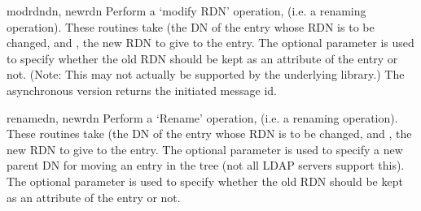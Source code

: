 
\begin{methoddesc}[LDAP]{modrdn}{dn, newrdn }
Perform a `modify RDN' operation, (i.e. a renaming operation).
These routines take  (the DN
of the entry whose RDN is to be changed, and , the new RDN to
give to the entry. The optional parameter  is used to specify
whether the old RDN should be kept as an attribute of the entry or not.
(Note: This may not actually be supported by the underlying library.)
The asynchronous version returns the initiated message id.
\end{methoddesc}


\begin{methoddesc}[LDAP]{rename}{dn, newrdn  }
Perform a `Rename' operation, (i.e. a renaming operation).
These routines take  (the DN
of the entry whose RDN is to be changed, and , the new RDN to
give to the entry.
The optional parameter  is used to specify
a new parent DN for moving an entry in the tree
(not all LDAP servers support this).
The optional parameter  is used to specify
whether the old RDN should be kept as an attribute of the entry or not.
\end{methoddesc}


